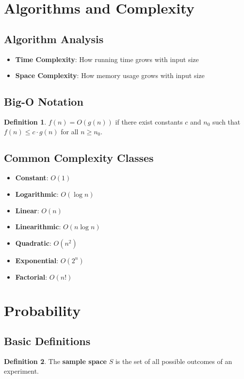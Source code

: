 \documentclass[11pt]{article}
\theoremstyle{definition}
\newtheorem{definition}{Definition}[section]
\begin{document}
\section{Algorithms and Complexity}

\subsection{Algorithm Analysis}
\begin{itemize}
    \item \textbf{Time Complexity}: How running time grows with input size
    \item \textbf{Space Complexity}: How memory usage grows with input size
\end{itemize}

\subsection{Big-O Notation}
\begin{definition}
$f(n) = O(g(n))$ if there exist constants $c$ and $n_0$ such that $f(n) \leq c \cdot g(n)$ for all $n \geq n_0$.
\end{definition}

\subsection{Common Complexity Classes}
\begin{itemize}
    \item \textbf{Constant}: $O(1)$
    \item \textbf{Logarithmic}: $O(\log n)$
    \item \textbf{Linear}: $O(n)$
    \item \textbf{Linearithmic}: $O(n \log n)$
    \item \textbf{Quadratic}: $O(n^2)$
    \item \textbf{Exponential}: $O(2^n)$
    \item \textbf{Factorial}: $O(n!)$
\end{itemize}

\section{Probability}

\subsection{Basic Definitions}
\begin{definition}
The \textbf{sample space} $S$ is the set of all possible outcomes of an experiment.
\end{definition}
\end{document}
